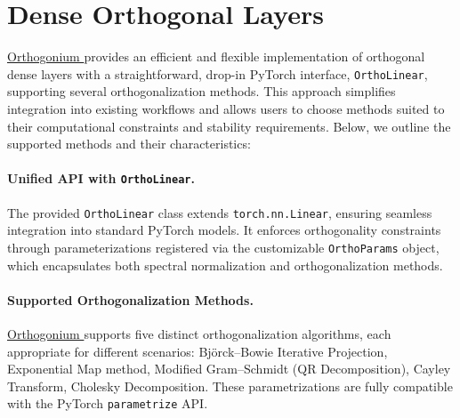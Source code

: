 \documentclass[10pt]{article}
\theoremstyle{plain}
\theoremstyle{definition}
\theoremstyle{remark}
\newcommand{\Orthogonium}{ \href{https://github.com/deel-ai/orthogonium/}{Orthogonium }}
\begin{document}
\section{Dense Orthogonal Layers}
\label{sec:dense}

    \Orthogonium provides an efficient and flexible implementation of orthogonal dense layers with a straightforward, drop-in PyTorch interface, \verb|OrthoLinear|, supporting several orthogonalization methods. This approach simplifies integration into existing workflows and allows users to choose methods suited to their computational constraints and stability requirements. Below, we outline the supported methods and their characteristics:
    
    \paragraph{Unified API with \texttt{OrthoLinear}.}
    The provided \verb|OrthoLinear| class extends \verb|torch.nn.Linear|, ensuring seamless integration into standard PyTorch models. It enforces orthogonality constraints through parameterizations registered via the customizable \verb|OrthoParams| object, which encapsulates both spectral normalization and orthogonalization methods.
    
    \paragraph{Supported Orthogonalization Methods.}
    \Orthogonium supports five distinct orthogonalization algorithms, each appropriate for different scenarios: Björck–Bowie Iterative Projection, Exponential Map method, Modified Gram–Schmidt (QR Decomposition), Cayley Transform, Cholesky Decomposition. These parametrizations are fully compatible with the PyTorch \texttt{parametrize} API.
        
        
        
\end{document}
